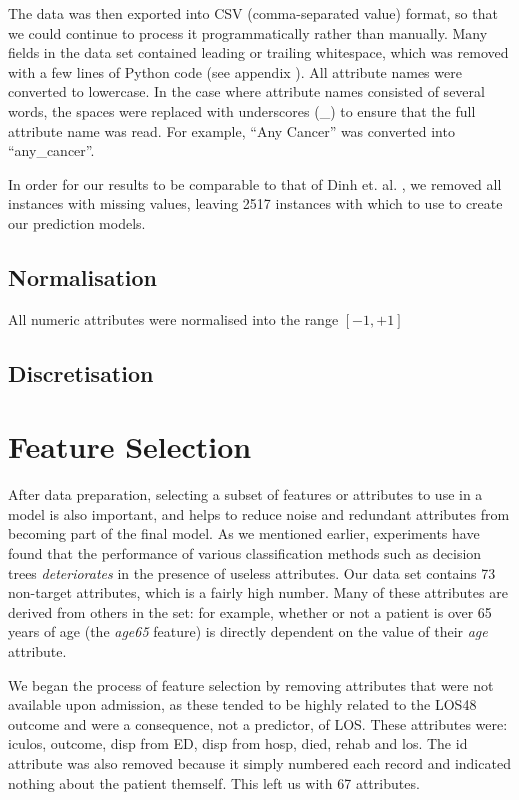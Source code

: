 The data was then exported into CSV (comma-separated value) format, so that
we could continue to process it programmatically rather than manually. Many
fields in the data set contained leading or trailing whitespace, which was
removed with a few lines of Python code (see appendix ). All attribute names were converted to lowercase. In the case
where attribute names consisted of several words, the spaces were replaced
with underscores (\_) to ensure that the full attribute name was read.
For example, ``Any Cancer'' was converted into ``any\_cancer''.

In order for our results to be comparable to that of Dinh
et. al. \citep{Dinh2013a}, we removed all instances with missing values,
leaving 2517 instances with which to use to create our prediction models.

\subsection{Normalisation}
All numeric attributes were normalised into the range $[-1,+1]$ 

\subsection{Discretisation}

\section{Feature Selection}
After data preparation, selecting a subset of features or attributes to use
in a model is also important, and helps to reduce noise and redundant
attributes from becoming part of the final model. As we mentioned earlier,
experiments have found that
the performance of various classification methods such as decision trees
\textit{deteriorates} in the presence of useless attributes.
Our data set contains 73
non-target attributes, which is a fairly high number. Many of these attributes
are derived from others in the set: for example, whether or not a patient is
over 65 years of age (the \textit{age65} feature) is directly dependent on the
value of their \textit{age} attribute.

We began the process of feature selection by removing attributes that were
not available upon admission, as these tended to be highly related to the
LOS48 outcome and were a consequence, not a predictor, of LOS. These attributes
were: iculos, outcome, disp from ED, disp from hosp, died, rehab and los.
The id attribute was also removed because it simply numbered each record and
indicated nothing about the patient themself. This left us with 67 attributes.

